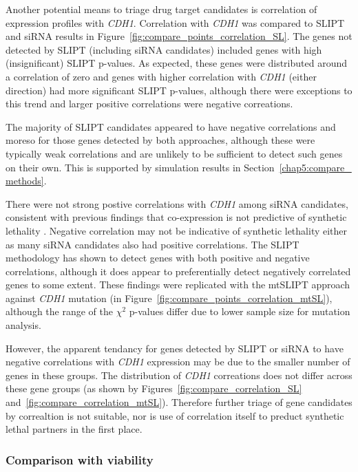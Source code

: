 Another potential means to triage drug target candidates is correlation of expression profiles with \textit{CDH1}. Correlation with \textit{CDH1} was compared to SLIPT and siRNA results in Figure~\ref{fig:compare_points_correlation_SL}. The genes not detected by SLIPT (including siRNA candidates) included genes with high (insignificant) SLIPT p-values. As expected, these genes were distributed around a correlation of zero and genes with higher correlation with \textit{CDH1} (either direction) had more significant SLIPT p-values, although there were exceptions to this trend and larger positive correlations were negative correations.

The majority of SLIPT candidates appeared to have negative correlations and moreso for those genes detected by both approaches, although these were typically weak correlations and are unlikely to be sufficient to detect such genes on their own. This is supported by simulation results in Section~\ref{chap5:compare_ methods}.

There were not strong postive correlations with \textit{CDH1} among siRNA candidates, consistent with previous findings that co-expression is not predictive of synthetic lethality \citep{Jerby2014, Lu2015}. Negative correlation may not be indicative of synthetic lethality either as many siRNA candidates also had positive correlations. The SLIPT methodology has shown to detect genes with both positive and negative correlations, although it does appear to preferentially detect negatively correlated genes to some extent. These findings were replicated with the mtSLIPT approach against \textit{CDH1} mutation (in Figure~\ref{fig:compare_points_correlation_mtSL}), although the range of the $\chi^2$ p-values differ due to lower sample size for mutation analysis.

However, the apparent tendancy for genes detected by SLIPT or siRNA to have negative correlations with \textit{CDH1} expression may be due to the smaller number of genes in these groups. The distribution of \textit{CDH1} correations does not differ across these gene groups (as shown by Figures~\ref{fig:compare_correlation_SL} and~\ref{fig:compare_correlation_mtSL}). Therefore further triage of gene candidates by correaltion is not suitable, nor is use of correlation itself to preduct synthetic lethal partners in the first place.

\FloatBarrier

\subsubsection{Comparison with viability} \label{chapt3:compare_viability}

